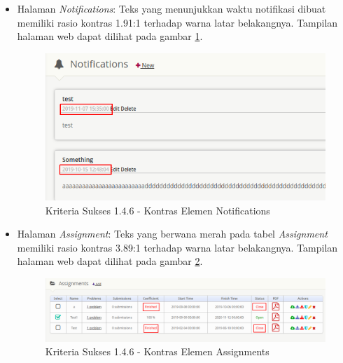 \documentclass[a4paper,twoside]{article}
\begin{document}
\begin{enumerate}
\begin{itemize}
			\item Halaman \textit{Notifications}: Teks yang menunjukkan waktu notifikasi dibuat memiliki rasio kontras 1.91:1 terhadap warna latar belakangnya. Tampilan halaman web dapat dilihat pada gambar \ref{fig:kepatuhan_1_4_6_notifications}.
			\begin{figure}[H]
				\centering  
				\includegraphics[scale=0.5]{kepatuhan_1_4_6_notifications}  
				\caption[Kriteria Sukses 1.4.6 - Kontras Elemen Notifications]{Kriteria Sukses 1.4.6 - Kontras Elemen Notifications} 
				\label{fig:kepatuhan_1_4_6_notifications} 
			\end{figure}
			
			\item Halaman \textit{Assignment}: Teks yang berwana merah pada tabel \textit{Assignment} memiliki rasio kontras 3.89:1 terhadap warna latar belakangnya. Tampilan halaman web dapat dilihat pada gambar \ref{fig:kepatuhan_1_4_6_assignments}.
			\begin{figure}[H]
				\centering  
				\includegraphics[scale=0.3]{kepatuhan_1_4_6_assignments}  
				\caption[Kriteria Sukses 1.4.6 - Kontras Elemen Assignments]{Kriteria Sukses 1.4.6 - Kontras Elemen Assignments} 
				\label{fig:kepatuhan_1_4_6_assignments} 
			\end{figure}
			

\end{itemize}
\end{enumerate}
\end{document}
